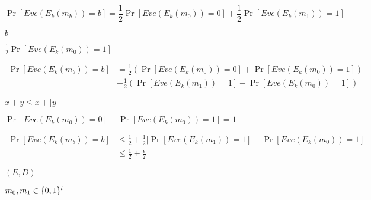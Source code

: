 \documentclass[10pt]{book}
\begin{document}
\begin{mdSnippets}
\begin{mdDisplaySnippet}[6f4b49248009c26ffb673a2827b1df2c]%
\[%
\Pr[Eve(E_k(m_b)) = b] = \frac{1}{2}\Pr[Eve(E_k(m_0)) = 0] + \frac{1}{2}\Pr[Eve(E_k(m_1)) = 1]
\]%
\end{mdDisplaySnippet}%
\begin{mdInlineSnippet}%
$b$\end{mdInlineSnippet}%
\begin{mdInlineSnippet}[44ef18667e4bf466dc437a9c3ec47d9b]%
$\frac{1}{2}\Pr[Eve(E_k(m_0)) = 1]$\end{mdInlineSnippet}%
\begin{mdDisplaySnippet}%
\[%
\begin{aligned}
\Pr[Eve(E_k(m_b)) = b] &= \frac{1}{2} (\Pr[Eve(E_k(m_0)) = 0] + \Pr[Eve(E_k(m_0)) = 1]) \\
&+\frac{1}{2}(\Pr[Eve(E_k(m_1)) = 1] - \Pr[Eve(E_k(m_0)) = 1])
\end{aligned}
\]%
\end{mdDisplaySnippet}%
\begin{mdInlineSnippet}[240f41919a2f2c65e0d4ffff46184e65]%
$x + y \leq x + |y|$\end{mdInlineSnippet}%
\begin{mdInlineSnippet}%
$\Pr[Eve(E_k(m_0)) = 0] + \Pr[Eve(E_k(m_0)) = 1] = 1$\end{mdInlineSnippet}%
\begin{mdDisplaySnippet}%
\[%
\begin{aligned}
\Pr[Eve(E_k(m_b)) = b] &\leq \frac{1}{2} + \frac{1}{2}|\Pr[Eve(E_k(m_1)) = 1] - \Pr[Eve(E_k(m_0)) = 1]| \\
&\leq \frac{1}{2} + \frac{\epsilon}{2} 
\end{aligned}
\]%
\end{mdDisplaySnippet}%
\begin{mdInlineSnippet}[c150726dc018e82825c0c3617f46a1c9]%
$(E,D)$\end{mdInlineSnippet}%
\begin{mdInlineSnippet}[79813aa61163871708c094e8192a07e2]%
$m_0,m_1 \in \{0,1\}^l$\end{mdInlineSnippet}%

\end{mdSnippets}
\end{document}
